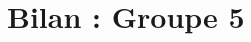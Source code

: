 \documentclass[12pt,french]{report}
\newcommand{\numeroGroupe}{5}
\begin{document}
\begin{spacing}{1.2}
\label{exo7}
\medskip
\begin{Exercice}[]%

\end{Exercice}

\label{exo8}
\medskip
\begin{Exercice}[]%

\end{Exercice}

\label{exo9}
\medskip
\begin{Exercice}[]%


\end{Exercice}

\label{exo10}
\medskip
\begin{Exercice}[]%

\end{Exercice}

\label{exo11}
\medskip
\begin{Exercice}[]%

\end{Exercice}


\newpage\section{Bilan : Groupe \numeroGroupe}



\end{spacing}
\end{document}
